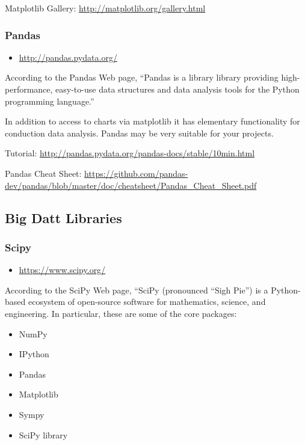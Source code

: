 Matplotlib Gallery: \url{http://matplotlib.org/gallery.html}

\subsubsection{Pandas}\label{pandas}

\begin{itemize}
\tightlist
\item
  \url{http://pandas.pydata.org/}
\end{itemize}

According to the Pandas Web page, ``Pandas is a library library
providing high-performance, easy-to-use data structures and data
analysis tools for the Python programming language.''

In addition to access to charts via matplotlib it has elementary
functionality for conduction data analysis. Pandas may be very suitable
for your projects.

Tutorial: \url{http://pandas.pydata.org/pandas-docs/stable/10min.html}

Pandas Cheat Sheet:
\url{https://github.com/pandas-dev/pandas/blob/master/doc/cheatsheet/Pandas_Cheat_Sheet.pdf}

\subsection{Big Datt Libraries}\label{other-useful-libraries}

\subsubsection{Scipy}\label{scipy}

\begin{itemize}
\tightlist
\item
  \url{https://www.scipy.org/}
\end{itemize}

According to the SciPy Web page, ``SciPy (pronounced ``Sigh Pie'') is a
Python-based ecosystem of open-source software for mathematics, science,
and engineering. In particular, these are some of the core packages:

\begin{itemize}
\tightlist
\item
  NumPy
\item
  IPython
\item
  Pandas
\item
  Matplotlib
\item
  Sympy
\item
  SciPy library
\end{itemize}

